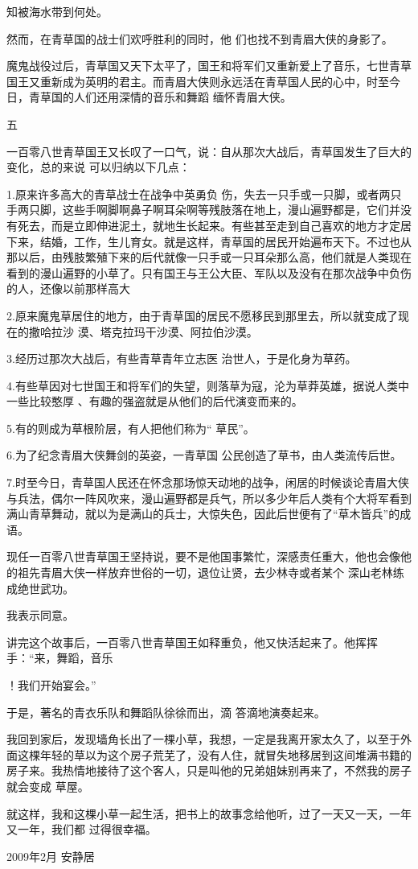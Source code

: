 \documentclass{article}
\begin{document}
\newpage
知被海水带到何处。 

然而，在青草国的战士们欢呼胜利的同时，他
们也找不到青眉大侠的身影了。 

魔鬼战役过后，青草国又天下太平了，国王和将军们又重新爱上了音乐，七世青草国王又重新成为英明的君主。而青眉大侠则永远活在青草国人民的心中，时至今日，青草国的人们还用深情的音乐和舞蹈
缅怀青眉大侠。 


 


                    
            五 

一百零八世青草国王又长叹了一口气，说：自从那次大战后，青草国发生了巨大的变化，总的来说
可以归纳以下几点： 

1.原来许多高大的青草战士在战争中英勇负
\newpage
伤，失去一只手或一只脚，或者两只手两只脚，这些手啊脚啊鼻子啊耳朵啊等残肢落在地上，漫山遍野都是，它们并没有死去，而是立即伸进泥土，就地生长起来。有些甚至走到自己喜欢的地方才定居下来，结婚，工作，生儿育女。就是这样，青草国的居民开始遍布天下。不过也从那以后，由残肢繁殖下来的后代就像一只手或一只耳朵那么高，他们就是人类现在看到的漫山遍野的小草了。只有国王与王公大臣、军队以及没有在那次战争中负伤的人，还像以前那样高大

2.原来魔鬼草居住的地方，由于青草国的居民不愿移民到那里去，所以就变成了现在的撒哈拉沙
漠、塔克拉玛干沙漠、阿拉伯沙漠。 

3.经历过那次大战后，有些青草青年立志医
治世人，于是化身为草药。 

4.有些草因对七世国王和将军们的失望，则落草为寇，沦为草莽英雄，据说人类中一些比较憨厚
、有趣的强盗就是从他们的后代演变而来的。 

\newpage

5.有的则成为草根阶层，有人把他们称为“
草民”。 

6.为了纪念青眉大侠舞剑的英姿，一青草国
公民创造了草书，由人类流传后世。 

7.时至今日，青草国人民还在怀念那场惊天动地的战争，闲居的时候谈论青眉大侠与兵法，偶尔一阵风吹来，漫山遍野都是兵气，所以多少年后人类有个大将军看到满山青草舞动，就以为是满山的兵士，大惊失色，因此后世便有了“草木皆兵”的成语。

现任一百零八世青草国王坚持说，要不是他国事繁忙，深感责任重大，他也会像他的祖先青眉大侠一样放弃世俗的一切，退位让贤，去少林寺或者某个
深山老林练成绝世武功。 


我表示同意。 

讲完这个故事后，一百零八世青草国王如释重负，他又快活起来了。他挥挥手：“来，舞蹈，音乐
\newpage

！我们开始宴会。” 

于是，著名的青衣乐队和舞蹈队徐徐而出，滴
答滴地演奏起来。 

我回到家后，发现墙角长出了一棵小草，我想，一定是我离开家太久了，以至于外面这棵年轻的草以为这个房子荒芜了，没有人住，就冒失地移居到这间堆满书籍的房子来。我热情地接待了这个客人，只是叫他的兄弟姐妹别再来了，不然我的房子就会变成
草屋。 

就这样，我和这棵小草一起生活，把书上的故事念给他听，过了一天又一天，一年又一年，我们都
过得很幸福。 



2009年2月  安静居 
\end{document}
